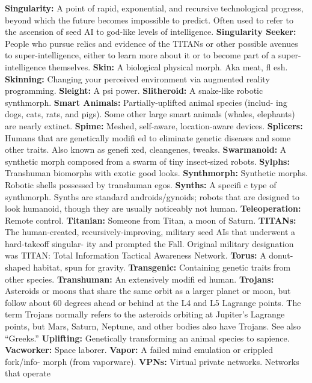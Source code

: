 \textbf{ Singularity:} A point of rapid, exponential, and recursive 
technological progress, beyond which the future becomes 
impossible to predict. Often used to refer to the ascension 
of seed AI to god-like levels of intelligence.
\textbf{ Singularity Seeker:} People who pursue relics and 
evidence of the TITANs or other possible avenues to 
super-intelligence, either to learn more about it or to 
become part of a super-intelligence themselves.
\textbf{ Skin:} A biological physical morph. Aka meat, ﬂ esh.
\textbf{ Skinning:} Changing your perceived environment via 
augmented reality programming.
\textbf{ Sleight:} A psi power.
\textbf{ Slitheroid:} A snake-like robotic synthmorph.
\textbf{ Smart Animals:} Partially-uplifted animal species (includ-
ing dogs, cats, rats, and pigs). Some other large smart 
animals (whales, elephants) are nearly extinct.
\textbf{ Spime:} Meshed, self-aware, location-aware devices.
\textbf{ Splicers:} Humans that are genetically modiﬁ ed to 
eliminate genetic diseases and some other traits. Also 
known as geneﬁ xed, cleangenes, tweaks.
\textbf{ Swarmanoid:} A synthetic morph composed from a 
swarm of tiny insect-sized robots.
\textbf{ Sylphs:} Transhuman biomorphs with exotic good looks.
\textbf{ Synthmorph:} Synthetic morphs. Robotic shells possessed 
by transhuman egos.
\textbf{ Synths:} A speciﬁ c type of synthmorph. Synths are 
standard androids/gynoids; robots that are designed to 
look humanoid, though they are usually noticeably not 
human.
\textbf{ Teleoperation:} Remote control.
\textbf{ Titanian:} Someone from Titan, a moon of Saturn.
\textbf{ TITANs:} The human-created, recursively-improving, 
military seed AIs that underwent a hard-takeoff singular-
ity and prompted the Fall. Original military designation 
was TITAN: Total Information Tactical Awareness Network.
\textbf{ Torus:} A donut-shaped habitat, spun for gravity.
\textbf{ Transgenic:} Containing genetic traits from other species.
\textbf{ Transhuman:} An extensively modiﬁ ed human.
\textbf{ Trojans:} Asteroids or moons that share the same orbit 
as a larger planet or moon, but follow about 60 degrees 
ahead or behind at the L4 and L5 Lagrange points. The 
term Trojans normally refers to the asteroids orbiting at 
Jupiter's Lagrange points, but Mars, Saturn, Neptune, and 
other bodies also have Trojans. See also ``Greeks.''
\textbf{ Uplifting:} Genetically transforming an animal species to 
sapience.
\textbf{ Vacworker:} Space laborer.
\textbf{ Vapor:} A failed mind emulation or crippled fork/info-
morph (from vaporware).
\textbf{ VPNs:} Virtual private networks. Networks that operate 
